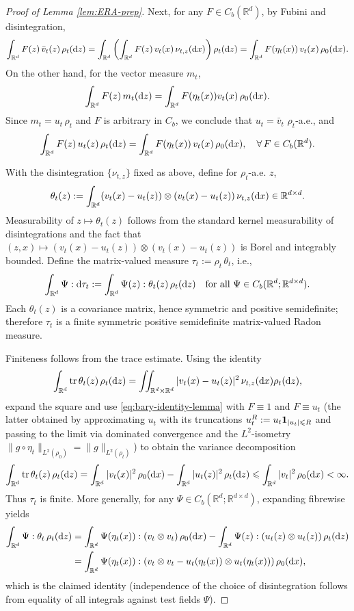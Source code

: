 \documentclass[10pt,reqno]{amsart}
\renewcommand{\le}{\leqslant}
\numberwithin{equation}{section}
\newcommand{\R}{\mathbb R}
\newcommand{\bq}{\begin{equation}}
\newcommand{\eq}{\end{equation}}
\newcommand{\lt}{\left}
\newcommand{\rt}{\right}
\newcommand{\intr}{\int_{\R^d}}
\newcommand{\intrr}{\iint_{\R^d \times \R^d}}
\newcommand{\rd}{\textnormal{d}}
\newcommand{\dx}{\textnormal{d}x}
\newcommand{\dz}{\textnormal{d}z}
\begin{document}
\begin{proof}[Proof of Lemma \ref{lem:ERA-prep}]
Next, for any $F\in C_b(\R^d)$, by Fubini and disintegration,
\[
\intr F(z)\,\bar v_t(z)\,\rho_t(\dz) = \intr \left(\intr F(z)\,v_t(x)\,\nu_{t,z}(\dx)\right)\rho_t(\dz) = \intr F(\eta_t(x))\,v_t(x)\,\rho_0(\dx).
\]
On the other hand, for the vector measure $m_t$,
\[
\intr F(z)\,m_t(\dz) = \intr F(\eta_t(x)) v_t(x)\,\rho_0(\dx).
\]
Since $m_t=u_t\,\rho_t$ and $F$ is arbitrary in $C_b$, we conclude that $u_t=\bar v_t$ $\rho_t$-a.e., and
\bq\label{eq:bary-identity-lemma}
\intr  F(z)\,u_t(z)\,\rho_t(\dz) = \intr  F(\eta_t(x))\,v_t(x)\,\rho_0(\dx),\quad \forall\,F\in C_b(\R^d).
\eq


\medskip
{} With the disintegration $\{\nu_{t,z}\}$ fixed as above, define for $\rho_t$-a.e.  $z$,
\[
\theta_t(z):=\intr (v_t(x)-u_t(z))\otimes (v_t(x)-u_t(z))\,\nu_{t,z}(\dx)\in\R^{d\times d}.
\]
Measurability of $z\mapsto\theta_t(z)$ follows from the standard kernel measurability of disintegrations and the fact that $(z,x)\mapsto (v_t(x)-u_t(z))\otimes(v_t(x)-u_t(z))$ is Borel and integrably bounded. Define the matrix-valued measure $\tau_t:=\rho_t\,\theta_t$, i.e.,
\[
\intr \Psi : \rd\tau_t := \intr \Psi(z):\theta_t(z)\,\rho_t(\dz)
\quad\text{for all }\Psi\in C_b(\R^d;\R^{d\times d}).
\]
Each $\theta_t(z)$ is a covariance matrix, hence symmetric and positive semidefinite; therefore $\tau_t$ is a finite symmetric positive semidefinite matrix-valued Radon measure.

\medskip
{}
Finiteness follows from the trace estimate. Using the identity
\[
\intr {\rm tr}\,\theta_t(z)\,\rho_t(\dz)
= \intrr |v_t(x)-u_t(z)|^2\,\nu_{t,z}(\dx) \rho_t(\dz),
\]
expand the square and use \eqref{eq:bary-identity-lemma} with $F\equiv 1$ and $F\equiv u_t$ (the latter obtained by approximating $u_t$ with its truncations $u_t^R:=u_t {\bf 1}_{{|u_t|\le R}}$ and passing to the limit via dominated convergence and the $L^2$-isometry $\|g\circ\eta_t\|_{L^2(\rho_0)} = \|g\|_{L^2(\rho_t)}$) to obtain the variance decomposition
\[
\intr  {\rm tr}\,\theta_t(z)\, \rho_t(\dz) = \intr |v_t(x)|^2\,\rho_0(\dx) - \intr |u_t(z)|^2\,\rho_t(\dz)
\le \intr |v_t|^2\,\rho_0(\dx) < \infty.
\] 
Thus $\tau_t$ is finite. More generally, for any $\Psi\in C_b(\R^d;\R^{d\times d})$, expanding fibrewise yields
\begin{align*}
\intr \Psi:\theta_t\,\rho_t(\dz)
&= \intr \Psi(\eta_t(x)):(v_t\otimes v_t)\,\rho_0(\dx)
 - \intr \Psi(z): (u_t(z)\otimes u_t(z))\,\rho_t(\dz)\\
&= \intr \Psi(\eta_t(x)):\lt(v_t\otimes v_t - u_t(\eta_t(x))\otimes u_t(\eta_t(x))\rt)\rho_0(\dx),
\end{align*}
which is the claimed identity (independence of the choice of disintegration follows from equality of all integrals against test fields $\Psi$).


\end{proof}
\end{document}
